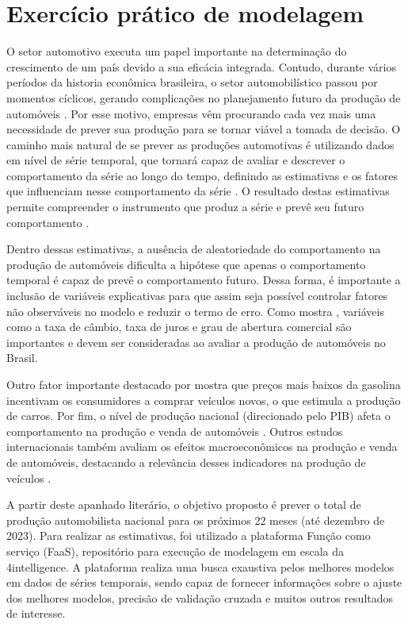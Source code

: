\documentclass[
article, %
12pt, %
oneside, %
a4paper, %
portuguese, %
portuguese %
]{abntex2}
\begin{document}
\section{Exercício prático de modelagem}

O setor automotivo executa um papel importante na determinação do crescimento de um país devido a sua eficácia integrada. Contudo, durante vários períodos da historia econômica brasileira, o setor automobilístico passou por momentos cíclicos, gerando complicações no planejamento futuro da produção de automóveis \cite{pereira2018aplicaccao}. Por esse motivo, empresas vêm procurando cada vez mais uma necessidade de prever sua produção para se tornar viável a tomada de decisão. O caminho mais natural de se prever as produções automotivas é utilizando dados em nível de série temporal, que tornará capaz de avaliar e descrever o comportamento da série ao longo do tempo, definindo as estimativas e os fatores que influenciam nesse comportamento da série \cite{latorre2001time,ceretta2010previsao,dos2012aplicaccao}. O resultado destas estimativas permite compreender o instrumento que produz a série e prevê seu futuro comportamento \cite{ceretta2010previsao}.

Dentro dessas estimativas, a ausência de aleatoriedade do comportamento na produção de automóveis dificulta a hipótese que apenas o comportamento temporal é capaz de prevê o comportamento futuro. Dessa forma, é importante a inclusão de variáveis explicativas para que assim seja possível controlar fatores não observáveis no modelo e reduzir o termo de erro. Como mostra , variáveis como a taxa de câmbio, taxa de juros e grau de abertura comercial são importantes e devem ser consideradas ao avaliar a produção de automóveis no Brasil.

Outro fator importante destacado por  mostra que preços mais baixos da gasolina incentivam os consumidores a comprar veículos novos, o que estimula a produção de carros. Por fim, o nível de produção nacional (direcionado pelo PIB) afeta o comportamento na produção e venda de automóveis \cite{ramey2004tracking}. Outros estudos internacionais também avaliam os efeitos macroeconômicos na produção e venda de automóveis, destacando a relevância desses indicadores na produção de veículos \cite{nawi2013determinants,muhammad2013relationship,islam2016analysis}.

A partir deste apanhado literário, o objetivo proposto é prever o total de produção automobilista nacional para os próximos 22 meses (até dezembro de 2023). Para realizar as estimativas, foi utilizado a plataforma Função como serviço (FaaS), repositório para execução de modelagem em escala da 4intelligence. A plataforma realiza uma busca exaustiva pelos melhores modelos em dados de séries temporais, sendo capaz de fornecer informações sobre o ajuste dos melhores modelos, precisão de validação cruzada e muitos outros resultados de interesse.
\end{document}
